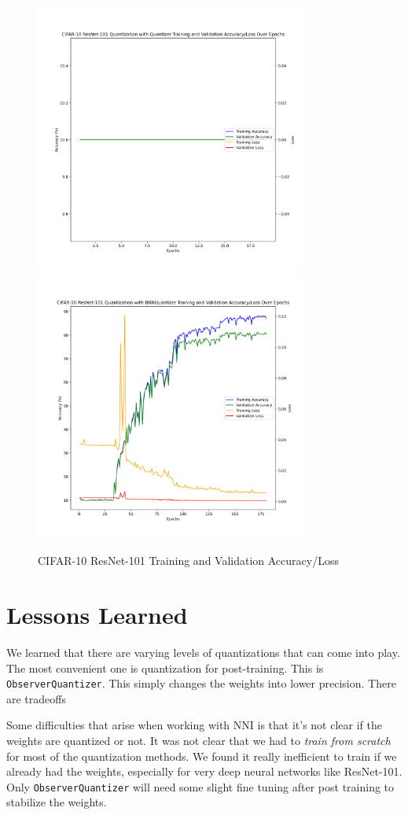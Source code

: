 \documentclass{article}
\begin{document}
\begin{figure}
    \centerline{\includegraphics[width=3.5in]{../proj2/figures/cifar10_resnet101_QAT_Quantizer.png}\includegraphics[width=3.5in]{../proj2/figures/cifar10_resnet101_BNNQuantizer.png}}
    \caption{CIFAR-10 ResNet-101 Training and Validation Accuracy/Loss}
    \label{fig:resnet-charts}
\end{figure}

\section{Lessons Learned}
We learned that there are varying levels of quantizations that can come into play. The most convenient one is quantization for post-training. This is \verb|ObserverQuantizer|. This simply changes the weights into lower precision. There are tradeoffs


Some difficulties that arise when working with NNI is that it's not clear if the weights are quantized or not. It was not clear that we had to \textit{train from scratch} for most of the quantization methods. We found it really inefficient to train if we already had the weights, especially for very deep neural networks like ResNet-101. Only \verb|ObserverQuantizer| will need some slight fine tuning after post training to stabilize the weights. 
\end{document}
